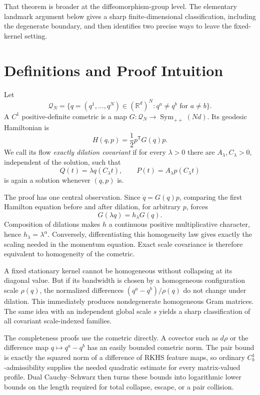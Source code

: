 \documentclass[11pt]{article}
\newcommand{\R}{\mathbb{R}}
\newcommand{\Q}{\mathcal{Q}}
\begin{document}
That theorem is broader at the diffeomorphism-group level.  The elementary
landmark argument below gives a sharp finite-dimensional classification,
including the degenerate boundary, and then identifies two precise ways to
leave the fixed-kernel setting.

\section*{Definitions and Proof Intuition}

Let
\[
 \Q_N=\{q=(q^1,\ldots,q^N)\in(\R^d)^N:q^a\neq q^b\text{ for }a\neq b\}.
\]
A \(C^1\) positive-definite cometric is a map
\(G:\Q_N\to\operatorname{Sym}_{++}(Nd)\).  Its geodesic Hamiltonian is
\begin{equation}
 H(q,p)=\frac12p^{\mathsf T}G(q)p.
 \label{eq:general-H}
\end{equation}
We call its flow \emph{exactly dilation covariant} if for every
\(\lambda>0\) there are \(A_\lambda,C_\lambda>0\), independent of the
solution, such that
\begin{equation}
 Q(t)=\lambda q(C_\lambda t),
 \qquad
 P(t)=A_\lambda p(C_\lambda t)
 \label{eq:covariance}
\end{equation}
is again a solution whenever \((q,p)\) is.

The proof has one central observation.  Since
\(\dot q=G(q)p\), comparing the first Hamilton equation before and after
dilation, for arbitrary \(p\), forces
\[
 G(\lambda q)=h_\lambda G(q).
\]
Composition of dilations makes \(h\) a continuous positive multiplicative
character, hence \(h_\lambda=\lambda^\alpha\).  Conversely, differentiating
this homogeneity law gives exactly the scaling needed in the momentum
equation.  Exact scale covariance is therefore equivalent to homogeneity of
the cometric.

A fixed stationary kernel cannot be homogeneous without collapsing at its
diagonal value.  But if its bandwidth is chosen by a homogeneous
configuration scale \(\rho(q)\), the normalized differences
\((q^a-q^b)/\rho(q)\) do not change under dilation.  This immediately produces
nondegenerate homogeneous Gram matrices.  The same idea with an independent
global scale \(s\) yields a sharp classification of all covariant
scale-indexed families.

The completeness proofs use the cometric directly.  A covector such as
\(d\rho\) or the difference map \(q\mapsto q^a-q^b\) has an easily bounded
cometric norm.  The pair bound is exactly the squared norm of a difference of
RKHS feature maps, so ordinary \(C_b^1\)-admissibility supplies the needed
quadratic estimate for every matrix-valued profile.  Dual Cauchy--Schwarz
then turns these bounds into logarithmic lower bounds on the length required
for total collapse, escape, or a pair collision.
\end{document}
